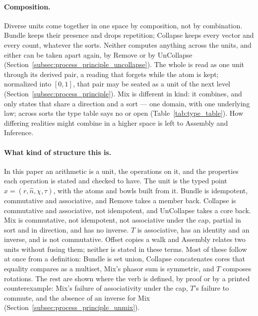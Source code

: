 \documentclass[12pt, a4paper]{article}
\begin{document}
\paragraph{Composition.} Diverse units come together in one space by composition, not by combination. Bundle keeps their presence and drops repetition; Collapse keeps every vector and every count, whatever the sorts. Neither computes anything across the units, and either can be taken apart again, by Remove or by UnCollapse (Section~\ref{subsec:process_principle_uncollapse}). The whole is read as one unit through its derived pair, a reading that forgets while the atom is kept; normalized into $[0,1]$, that pair may be seated as a unit of the next level (Section~\ref{subsec:process_principle}). Mix is different in kind: it combines, and only states that share a direction and a sort --- one domain, with one underlying law; across sorts the type table says no or open (Table~\ref{tab:type_table}). How differing realities might combine in a higher space is left to Assembly and Inference.

\paragraph{What kind of structure this is.} In this paper an arithmetic is a unit, the operations on it, and the properties each operation is stated and checked to have. The unit is the typed point $x=(r,\hat n,\chi,\tau)$, with the atoms and bowls built from it. Bundle is idempotent, commutative and associative, and Remove takes a member back. Collapse is commutative and associative, not idempotent, and UnCollapse takes a core back. Mix is commutative, not idempotent, not associative under the cap, partial in sort and in direction, and has no inverse. $T$ is associative, has an identity and an inverse, and is not commutative. Offset copies a walk and Assembly relates two units without fusing them; neither is stated in these terms. Most of these follow at once from a definition: Bundle is set union, Collapse concatenates cores that equality compares as a multiset, Mix's phasor sum is symmetric, and $T$ composes rotations. The rest are shown where the verb is defined, by proof or by a printed counterexample: Mix's failure of associativity under the cap, $T$'s failure to commute, and the absence of an inverse for Mix (Section~\ref{subsec:process_principle_unmix}).
\end{document}
